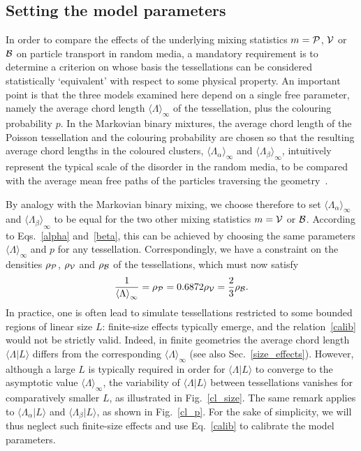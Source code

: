 \documentclass[final,authoryear,5p,times,twocolumn]{elsarticle}
\begin{document}
\subsection{Setting the model parameters}

In order to compare the effects of the underlying mixing statistics $m={\cal P}$, ${\cal V}$ or ${\cal B}$ on particle transport in random media, a mandatory requirement is to determine a criterion on whose basis the tessellations can be considered statistically `equivalent' with respect to some physical property. An important point is that the three models examined here depend on a single free parameter, namely the average chord length ${\langle \Lambda \rangle}_{\infty}$ of the tessellation, plus the colouring probability $p$. In the Markovian binary mixtures, the average chord length of the Poisson tessellation and the colouring probability are chosen so that the resulting average chord lengths in the coloured clusters, ${\langle \Lambda_{\alpha} \rangle}_{\infty}$ and ${\langle \Lambda_{\beta} \rangle}_{\infty}$, intuitively represent the typical scale of the disorder in the random media, to be compared with the average mean free paths of the particles traversing the geometry~\cite{pomraning}.

By analogy with the Markovian binary mixing, we choose therefore to set ${\langle \Lambda_{\alpha} \rangle}_{\infty}$ and ${\langle \Lambda_{\beta} \rangle}_{\infty}$ to be equal for the two other mixing statistics $m={\cal V}$ or ${\cal B}$. According to Eqs.~\ref{alpha} and~\ref{beta}, this can be achieved by choosing the same parameters ${\langle \Lambda \rangle}_{\infty}$ and $p$ for any tessellation. Correspondingly, we have a constraint on the densities $\rho_{\cal P}$, $\rho_{\cal V}$ and $\rho_{\cal B}$ of the tessellations, which must now satisfy
\begin{equation}
\frac{1}{{\langle \Lambda \rangle}_{\infty}} =\rho_{\cal P}=0.6872 \rho_{\cal V} =\frac{2}{3} \rho_{\cal B}.
\label{calib}
\end{equation}
In practice, one is often lead to simulate tessellations restricted to some bounded regions of linear size $L$: finite-size effects typically emerge, and the relation~\eqref{calib} would not be strictly valid. Indeed, in finite geometries the average chord length ${\langle \Lambda | L \rangle}$ differs from the corresponding ${\langle \Lambda \rangle}_{\infty}$ (see also Sec.~\ref{size_effects}). However, although a large $L$ is typically required in order for ${\langle \Lambda  | L \rangle}$ to converge to the asymptotic value ${\langle \Lambda \rangle}_{\infty}$, the variability of ${\langle \Lambda | L \rangle}$ between tessellations vanishes for comparatively smaller $L$, as illustrated in Fig.~\ref{cl_size}. The same remark applies to ${\langle \Lambda_{\alpha} | L\rangle}$ and ${\langle \Lambda_{\beta} | L\rangle}$, as shown in Fig.~\ref{cl_p}. For the sake of simplicity, we will thus neglect such finite-size effects and use Eq.~\eqref{calib} to calibrate the model parameters.
\end{document}
